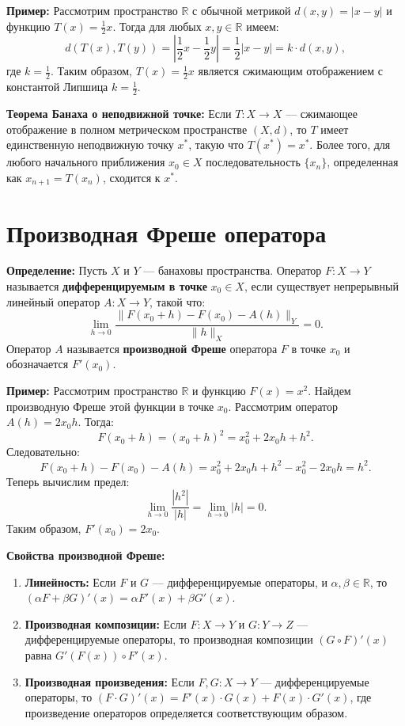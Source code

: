 \documentclass{article}
\begin{document}
\textbf{Пример:} Рассмотрим пространство \(\mathbb{R}\) с обычной метрикой \(d(x, y) = |x - y|\) и функцию \(T(x) = \frac{1}{2}x\). Тогда для любых \(x, y \in \mathbb{R}\) имеем:
\[ d(T(x), T(y)) = \left| \frac{1}{2}x - \frac{1}{2}y \right| = \frac{1}{2}|x - y| = k \cdot d(x, y), \]
где \(k = \frac{1}{2}\). Таким образом, \(T(x) = \frac{1}{2}x\) является сжимающим отображением с константой Липшица \(k = \frac{1}{2}\).

\textbf{Теорема Банаха о неподвижной точке:} Если \(T: X \rightarrow X\) — сжимающее отображение в полном метрическом пространстве \((X, d)\), то \(T\) имеет единственную неподвижную точку \(x^*\), такую что \(T(x^*) = x^*\). Более того, для любого начального приближения \(x_0 \in X\) последовательность \(\{x_n\}\), определенная как \(x_{n+1} = T(x_n)\), сходится к \(x^*\).

\section{Производная Фреше оператора}

\textbf{Определение:} Пусть \(X\) и \(Y\) — банаховы пространства. Оператор \(F: X \rightarrow Y\) называется \textbf{дифференцируемым в точке} \(x_0 \in X\), если существует непрерывный линейный оператор \(A: X \rightarrow Y\), такой что:
\[ \lim_{h \to 0} \frac{\|F(x_0 + h) - F(x_0) - A(h)\|_Y}{\|h\|_X} = 0. \]
Оператор \(A\) называется \textbf{производной Фреше} оператора \(F\) в точке \(x_0\) и обозначается \(F'(x_0)\).

\textbf{Пример:} Рассмотрим пространство \(\mathbb{R}\) и функцию \(F(x) = x^2\). Найдем производную Фреше этой функции в точке \(x_0\). Рассмотрим оператор \(A(h) = 2x_0 h\). Тогда:
\[ F(x_0 + h) = (x_0 + h)^2 = x_0^2 + 2x_0 h + h^2. \]
Следовательно:
\[ F(x_0 + h) - F(x_0) - A(h) = x_0^2 + 2x_0 h + h^2 - x_0^2 - 2x_0 h = h^2. \]
Теперь вычислим предел:
\[ \lim_{h \to 0} \frac{|h^2|}{|h|} = \lim_{h \to 0} |h| = 0. \]
Таким образом, \(F'(x_0) = 2x_0\).

\textbf{Свойства производной Фреше:}
\begin{enumerate}
    \item \textbf{Линейность:} Если \(F\) и \(G\) — дифференцируемые операторы, и \(\alpha, \beta \in \mathbb{R}\), то \((\alpha F + \beta G)'(x) = \alpha F'(x) + \beta G'(x)\).
    \item \textbf{Производная композиции:} Если \(F: X \rightarrow Y\) и \(G: Y \rightarrow Z\) — дифференцируемые операторы, то производная композиции \((G \circ F)'(x)\) равна \(G'(F(x)) \circ F'(x)\).
    \item \textbf{Производная произведения:} Если \(F, G: X \rightarrow Y\) — дифференцируемые операторы, то \((F \cdot G)'(x) = F'(x) \cdot G(x) + F(x) \cdot G'(x)\), где произведение операторов определяется соответствующим образом.
\end{enumerate}
\end{document}
